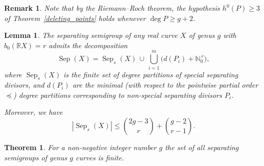 \documentclass[10pt,a4paper]{amsart}
\newtheorem{theorem}{Theorem}
\newtheorem{remark}{Remark}
\newtheorem{lemma}{Lemma}
\newcommand{\N}{\mathbb{N}}
\newcommand{\R}{\mathbb{R}}
\DeclareMathOperator{\Sep}{Sep}
\begin{document}
  \begin{remark}\label{degree_g+2}
    Note that by the Riemann--Roch theorem, the hypothesis $h^0(P)\geqslant3$ of Theorem~\ref{deleting_points} holds whenever $\deg P\geqslant g+2$.
  \end{remark}

  \begin{lemma}\label{main_lemma}
  The separating semigroup of any real curve $X$ of genus $g$ with $b_0(\R X) = r$ admits the decomposition
  \[
    \Sep(X) = \Sep_s(X) \,\cup\, \bigcup_{i=1}^{m} \bigl( d(P_i) + \N_0^{\,r} \bigr),
  \]
  where $\Sep_s(X)$ is the finite set of degree partitions of special separating divisors, and $d(P_i)$ are the minimal (with respect to the pointwise partial order $\preceq$) degree partitions  corresponding to non-special separating divisors $P_i$.

  Moreover, we have
  \[
    |\Sep_s(X)| \leqslant \binom{2g - 3}{r} + \binom{g - 2}{r - 1}.
  \]
  \end{lemma}

  \begin{theorem}\label{main_thm}
    For a non-negative integer number $g$ the set of all separating semigroups of genus $g$ curves is finite. 
  \end{theorem}
\end{document}
